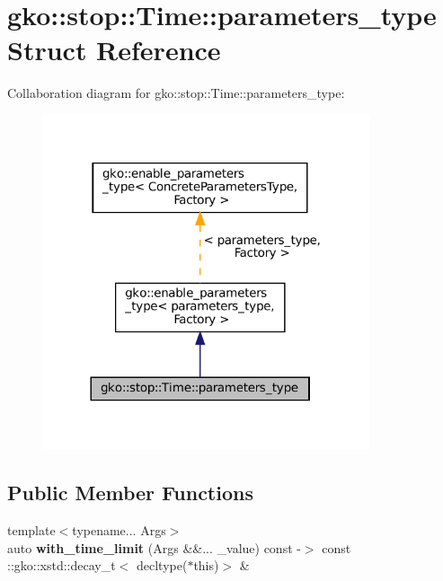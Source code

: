 \hypertarget{structgko_1_1stop_1_1Time_1_1parameters__type}{}\section{gko\+:\+:stop\+:\+:Time\+:\+:parameters\+\_\+type Struct Reference}
\label{structgko_1_1stop_1_1Time_1_1parameters__type}


Collaboration diagram for gko\+:\+:stop\+:\+:Time\+:\+:parameters\+\_\+type\+:
\nopagebreak
\begin{figure}[H]
\begin{center}
\leavevmode
\includegraphics[width=272pt]{structgko_1_1stop_1_1Time_1_1parameters__type__coll__graph}
\end{center}
\end{figure}
\subsection*{Public Member Functions}
\begin{DoxyCompactItemize}
\item 
\mbox{\label{structgko_1_1stop_1_1Time_1_1parameters__type_a9f90897204eb20d3f7d26ca6313db69b}} 
{\footnotesize template$<$typename... Args$>$ }\\auto {\bfseries with\+\_\+time\+\_\+limit} (Args \&\&... \+\_\+value) const -\/$>$ const \+::gko\+::xstd\+::decay\+\_\+t$<$ decltype($\ast$this)$>$ \&
\end{DoxyCompactItemize}
